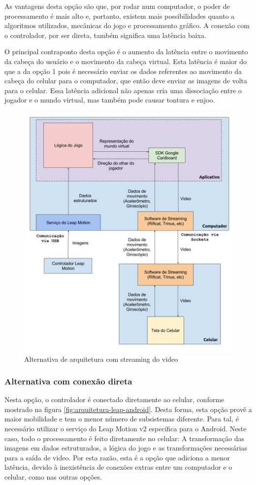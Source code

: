 As vantagens desta opção são que, por rodar num computador, o poder de processamento é mais alto e, portanto, existem mais possibilidades quanto a algoritmos utilizados, mecânicas do jogo e processamento gráfico. A conexão com o controlador, por ser direta, também significa uma latência baixa. 

O principal contraponto desta opção é o aumento da latência entre o movimento da cabeça do usuário e o movimento da cabeça virtual. Esta latência é maior do que a da opção 1 pois é necessário enviar os dados referentes ao movimento da cabeça do celular para o computador, que então deve enviar as imagens de volta para o celular. Essa latência adicional não apenas cria uma dissociação entre o jogador e o mundo virtual, mas também pode causar tontura e enjoo.

\begin{figure}
	\centering
	\includegraphics[width=0.7\linewidth]{images/Arquitetura-leap-pc-riftcat-android}
	\caption{Alternativa de arquitetura com streaming do video}
	\label{fig:Arquitetura-leap-pc-riftcat-android}
\end{figure}

\subsubsection{Alternativa com conexão direta}\label{subsubsec-arquiteturas-leapmotion-android}

Nesta opção, o controlador é conectado diretamente ao celular, conforme mostrado na figura \ref{fig:arquitetura-leap-android}. Desta forma, esta opção provê a maior mobilidade e tem o menor número de subsistemas diferente. Para tal, é necessário utilizar o serviço do Leap Motion v2 específica para o Android. Neste caso, todo o processamento é feito diretamente no celular: A transformação das imagens em dados estruturados, a lógica do jogo e as transformações necessárias para a saída de video. Por esta razão, esta é a opção que adiciona a menor latência, devido à inexistência de conexões extras entre um computador e o celular, como nas outras opções.


